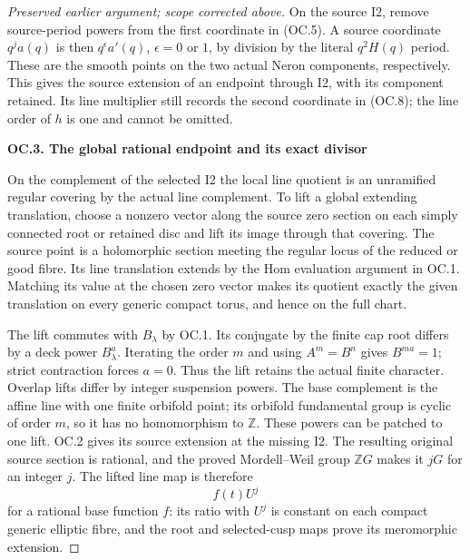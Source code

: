 \begin{proof}[Preserved earlier argument; scope corrected above]
On the source I2, remove source-period powers from the first
coordinate in (OC.5). A source coordinate \(q^j a(q)\) is
then \(q^\epsilon a'(q)\), \(\epsilon=0\) or \(1\),
by division by the literal \(q^2H(q)\) period. These are the
smooth points on the two actual Neron components, respectively.
This gives the source extension of an endpoint through I2, with
its component retained. Its line multiplier still records the
second coordinate in (OC.8); the line order of \(h\) is one
and cannot be omitted.

\par

\medskip\noindent\textbf{OC.3. The global rational endpoint and its exact divisor}

\par\nobreak

On the complement of the selected I2 the local line quotient is an
unramified regular covering by the actual line complement. To lift
a global extending translation, choose a nonzero vector along the
source zero section on each simply connected root or retained disc
and lift its image through that covering. The source point is a
holomorphic section meeting the regular locus of the reduced or
good fibre. Its line translation extends by the Hom evaluation
argument in OC.1. Matching its value at the chosen zero vector
makes its quotient exactly the given translation on every generic
compact torus, and hence on the full chart.

The lift commutes with \(B_\lambda\) by OC.1. Its conjugate
by the finite cap root differs by a deck power \(B_\lambda^a\).
Iterating the order \(m\) and using \(A^m=B^n\) gives
\(B^{ma}=1\); strict contraction forces \(a=0\). Thus the
lift retains the actual finite character. Overlap lifts differ by
integer suspension powers. The base complement is the affine line
with one finite orbifold point; its orbifold fundamental group is
cyclic of order \(m\), so it has no homomorphism to \(\mathbb Z\).
These powers can be patched to one lift. OC.2 gives its source
extension at the missing I2. The resulting original source section
is rational, and the proved Mordell--Weil group \(\mathbb ZG\)
makes it \(jG\) for an integer \(j\). The lifted line map is
therefore
\[
                            f(t)U^j                       \tag{OC.9}
\]
for a rational base function \(f\): its ratio with \(U^j\)
is constant on each compact generic elliptic fibre, and the root
and selected-cusp maps prove its meromorphic extension.


\end{proof}
